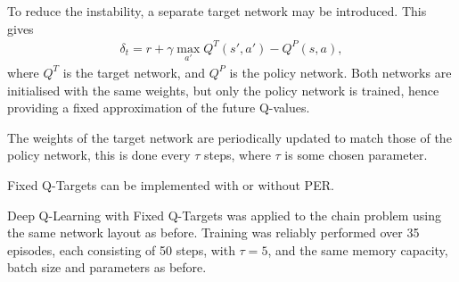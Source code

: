 To reduce the instability, a separate target network may be introduced.
This gives
\begin{align*}
    \delta_t = r + \gamma\max_{a'}Q^T(s',a') - Q^P(s,a),
\end{align*}
where $Q^T$ is the target network, and $Q^P$ is the policy network.
Both networks are initialised with the same weights, but only the policy network
is trained, hence providing a fixed approximation of the future Q-values.

The weights of the target network are periodically updated to match those of the
policy network, this is done every $\tau$ steps, where $\tau$ is some chosen
parameter.

Fixed Q-Targets can be implemented with or without PER.

Deep Q-Learning with Fixed Q-Targets was applied to the chain problem using the
same network layout as before.
Training was reliably performed over 35 episodes, each consisting of 50 steps,
with $\tau = 5$, and the same memory capacity, batch size and parameters as
before.

